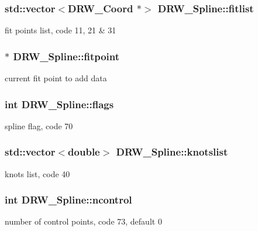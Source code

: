 \subsubsection[{fitlist}]{\setlength{\rightskip}{0pt plus 5cm}std\+::vector$<${\bf D\+R\+W\+\_\+\+Coord} $\ast$$>$ D\+R\+W\+\_\+\+Spline\+::fitlist}\label{class_d_r_w___spline_aeefb7618b8c983a9abe32f974c8ca852}
fit points list, code 11, 21 \& 31 \hypertarget{class_d_r_w___spline_a63415bb4da307f0355bbbbac50a7bc47}{}
\subsubsection[{fitpoint}]{$\ast$ D\+R\+W\+\_\+\+Spline\+::fitpoint\hspace{0.3cm}{\ttfamily [private]}}\label{class_d_r_w___spline_a63415bb4da307f0355bbbbac50a7bc47}
current fit point to add data \hypertarget{class_d_r_w___spline_a49110f44d95d47090449c56beaaac3ca}{}
\subsubsection[{flags}]{\setlength{\rightskip}{0pt plus 5cm}int D\+R\+W\+\_\+\+Spline\+::flags}\label{class_d_r_w___spline_a49110f44d95d47090449c56beaaac3ca}
spline flag, code 70 \hypertarget{class_d_r_w___spline_a90bf2f53cd19d98629e393f3cdd36c95}{}
\subsubsection[{knotslist}]{\setlength{\rightskip}{0pt plus 5cm}std\+::vector$<$double$>$ D\+R\+W\+\_\+\+Spline\+::knotslist}\label{class_d_r_w___spline_a90bf2f53cd19d98629e393f3cdd36c95}
knots list, code 40 \hypertarget{class_d_r_w___spline_a73dcf2fa67f1029e4a8d6577b5b51656}{}
\subsubsection[{ncontrol}]{\setlength{\rightskip}{0pt plus 5cm}int D\+R\+W\+\_\+\+Spline\+::ncontrol}\label{class_d_r_w___spline_a73dcf2fa67f1029e4a8d6577b5b51656}
number of control points, code 73, default 0 \hypertarget{class_d_r_w___spline_aa9269fcfa581a0e0b25a84fb8dddc96c}{}
